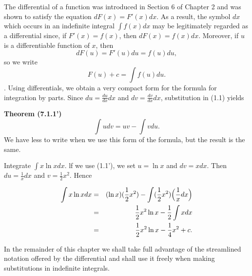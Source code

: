 The differential of a function was introduced in Section 6 of Chapter 2 and was shown to satisfy the equation $dF(x) = F'(x) dx$. As a result, the symbol $dx$ which occurs in an indefinite integral $\int f(x) dx$ may be legitimately regarded as a differential since, if $F'(x) = f(x)$, then $dF(x) = f(x)dx$. Moreover, if $u$ is a differentiable function of $x$, then
$$
dF(u) = F'(u) du = f (u) du, 
$$
\noindent so we write
$$
F(u) + c = \int f (u) du. 
$$
. Using differentials, we obtain a very compact form for the formula for integration by parts. Since $du = \frac{du}{dx}dx$ and $dv = \frac{dv}{dx} dx$, substitution in (1.1) yields 

\medskip
\noindent \textbf{Theorem (7.1.1')} %
$$
\int udv = uv - \int v du. 
$$
\medskip
We have less to write when we use this form of the formula, but the result is the same.


\begin{example}
Integrate $\int x \ln x dx$. lf we use (1.1'), we set $u= \ln x$ and $dv = x dx$. 
Then $du = \frac{1}{x}dx$ and $v = \frac{1}{2} x^2$. Hence

\begin{eqnarray*}
\int x \ln x dx &=& (\ln x)(\frac{1}{2}x^2) - \int (\frac{1}{2}x^2 ) \Bigl( \frac{1}{x} dx \Bigr) \\
&=& \frac{1}{2} x^{2} \ln x - \frac{1}{2} \int x dx\\
&=& \frac{1}{2} x^{2} \ln x - \frac{1}{4} x^2 + c.
\end{eqnarray*}
\end{example}

In the remainder of this chapter we shall take full advantage of the streamlined notation offered by the differential and shall use it freely when making substitutions in indefinite integrals.

